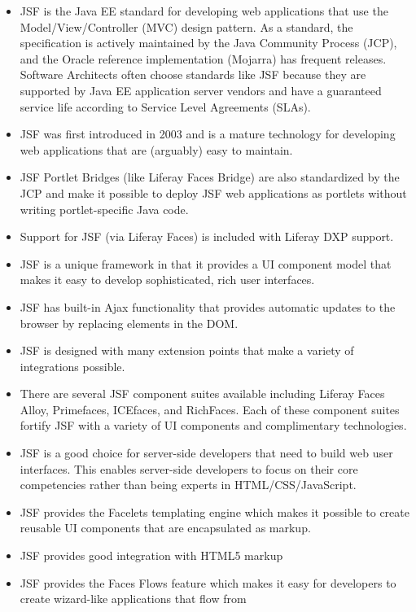 \begin{itemize}
\tightlist
\item
  JSF is the Java EE standard for developing web applications that use
  the Model/View/Controller (MVC) design pattern. As a standard, the
  specification is actively maintained by the Java Community Process
  (JCP), and the Oracle reference implementation (Mojarra) has frequent
  releases. Software Architects often choose standards like JSF because
  they are supported by Java EE application server vendors and have a
  guaranteed service life according to Service Level Agreements (SLAs).
\item
  JSF was first introduced in 2003 and is a mature technology for
  developing web applications that are (arguably) easy to maintain.
\item
  JSF Portlet Bridges (like Liferay Faces Bridge) are also standardized
  by the JCP and make it possible to deploy JSF web applications as
  portlets without writing portlet-specific Java code.
\item
  Support for JSF (via Liferay Faces) is included with Liferay DXP
  support.
\item
  JSF is a unique framework in that it provides a UI component model
  that makes it easy to develop sophisticated, rich user interfaces.
\item
  JSF has built-in Ajax functionality that provides automatic updates to
  the browser by replacing elements in the DOM.
\item
  JSF is designed with many extension points that make a variety of
  integrations possible.
\item
  There are several JSF component suites available including Liferay
  Faces Alloy, Primefaces, ICEfaces, and RichFaces. Each of these
  component suites fortify JSF with a variety of UI components and
  complimentary technologies.
\item
  JSF is a good choice for server-side developers that need to build web
  user interfaces. This enables server-side developers to focus on their
  core competencies rather than being experts in HTML/CSS/JavaScript.
\item
  JSF provides the Facelets templating engine which makes it possible to
  create reusable UI components that are encapsulated as markup.
\item
  JSF provides good integration with HTML5 markup
\item
  JSF provides the Faces Flows feature which makes it easy for
  developers to create wizard-like applications that flow from

\end{itemize}
